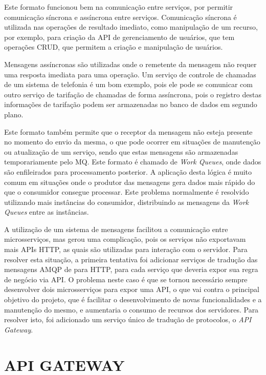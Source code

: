 Este formato funcionou bem na comunicação entre serviços, por permitir comunicação
síncrona e assíncrona entre serviços. Comunicação síncrona é utilizada nas operações
de resultado imediato, como manipulação de um recurso, por exemplo, para criação
da \ac{API} de gerenciamento de usuários, que tem operações \ac{CRUD}, que
permitem a criação e manipulação de usuários.

Mensagens assíncronas são utilizadas onde o remetente da mensagem não requer uma
resposta imediata para uma operação. Um serviço de controle de chamadas de um
sistema de telefonia é um bom exemplo, pois ele pode se comunicar com outro
serviço de tarifação de chamadas de forma assíncrona, pois o registro destas
informações de tarifação podem ser armazenadas no banco de dados em segundo
plano.

Este formato também permite que o receptor da mensagem não esteja
presente no momento do envio da mesma, o que pode ocorrer em situações de
manutenção ou atualização de um serviço, sendo que estas mensagens são
armazenadas temporariamente pelo \ac{MQ}. Este formato é chamado de
\emph{Work Queues}, onde dados são enfileirados para processamento
posterior. A aplicação desta lógica é muito comum em situações onde o
produtor das mensagens gera dados mais rápido do que o consumidor consegue
processar. Este problema normalmente é resolvido utilizando mais instâncias
do consumidor, distribuindo as mensagens da \emph{Work Queues} entre as
instâncias.

A utilização de um sistema de mensagens facilitou a comunicação entre microsserviços,
mas gerou uma complicação, pois os serviços não exportavam mais \acp{API} \ac{HTTP},
as quais são utilizadas para interação com o servidor. Para resolver esta situação,
a primeira tentativa foi adicionar serviços de tradução das mensagens \ac{AMQP} de
para \ac{HTTP}, para cada serviço que deveria expor sua regra de negócio via \ac{API}.
O problema neste caso é que se tornou necessário sempre desenvolver dois microsserviços
para expor uma \ac{API}, o que vai contra o principal objetivo do projeto, que é facilitar
o desenvolvimento de novas funcionalidades e a manutenção do mesmo, e aumentaria o
consumo de recursos dos servidores. Para resolver isto, foi adicionado um serviço
único de tradução de protocolos, o \emph{API Gateway}.

\section{API GATEWAY}

